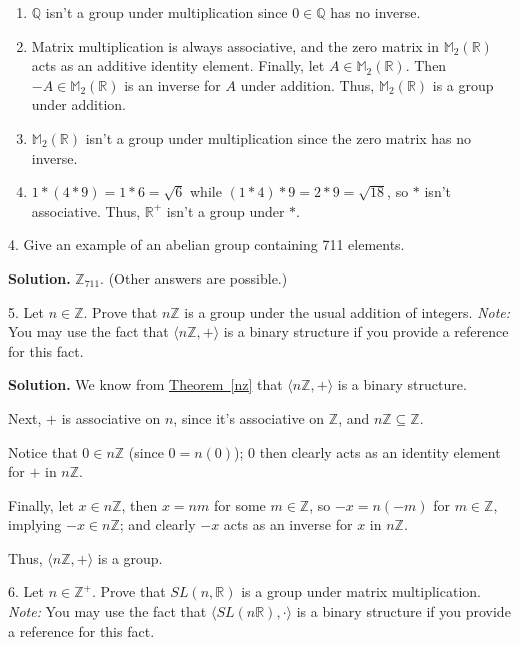 \documentclass[10pt,]{book}
\theoremstyle{plain}
\theoremstyle{definition}
\theoremstyle{definition}
\theoremstyle{definition}
\theoremstyle{definition}
\numberwithin{equation}{section}
\def\Z{\mathbb{Z}}
\def\R{\mathbb{R}}
\def\Q{\mathbb{Q}}
\def\M{\mathbb{M}}
\begin{document}
\begin{exerciselist}
\begin{enumerate}[label=(\alph*)]
\item\hypertarget{li-119}{}\(\Q\) isn't a group under multiplication since \(0\in \Q\) has no inverse.%
\item\hypertarget{li-120}{}Matrix multiplication is always associative, and the zero matrix in \(\M_2(\R)\) acts as an additive identity element.            Finally, let \(A\in \M_2(\R)\).  Then \(-A\in \M_2(\R)\) is an inverse for \(A\) under addition. Thus, \(\M_2(\R)\) is a group under addition.%
\item\hypertarget{li-121}{}\(\M_2(\R)\) isn't a group under multiplication since the zero matrix has no inverse.%
\item\hypertarget{li-122}{}\(1*(4*9)=1*6=\sqrt{6}\) while \((1*4)*9=2*9=\sqrt{18}\), so \(*\) isn't associative.  Thus, \(\R^+\) isn't a group under \(*\).%
\end{enumerate}
%
\item[4.]\hypertarget{exercise-15}{}Give an example of an abelian group containing 711 elements.%
\par\smallskip
\par\smallskip
\noindent\textbf{Solution.}\hypertarget{solution-15}{}\quad
\(\Z_{711}\). (Other answers are possible.)%
\item[5.]\hypertarget{exercise-16}{}Let \(n\in \Z\). Prove that \(n\Z\) is a group under the usual addition of integers. \emph{Note:} You may use the fact that \(\langle n\Z,+\rangle\) is a binary structure if you provide a reference for this fact.%
\par\smallskip
\par\smallskip
\noindent\textbf{Solution.}\hypertarget{solution-16}{}\quad
We know from \hyperref[nz]{Theorem~\ref{nz}} that \(\langle n\Z,+\rangle\) is a binary structure.%
\par
Next, \(+\) is associative on \(n\), since it's associative on \(\Z\), and \(n\Z \subseteq \Z\).%
\par
Notice that \(0\in n\Z\) (since \(0=n(0)\)); 0 then clearly acts as an identity element for \(+\) in \(n\Z\).%
\par
Finally, let \(x\in n\Z\), then \(x=nm\) for some \(m\in \Z\), so \(-x=n(-m)\) for \(m\in \Z\), implying \(-x\in n\Z\); and clearly \(-x\) acts as an inverse for \(x\) in \(n\Z\).%
\par
Thus, \(\langle n\Z, +\rangle\) is a group.%
\item[6.]\hypertarget{exercise-17}{}Let \(n\in \Z^+\). Prove that \(SL(n,\R)\) is a group under matrix multiplication. \emph{Note:} You may use the fact that \(\langle SL(n\R),\cdot\rangle\) is a binary structure if you provide a reference for this fact.%

\end{exerciselist}
\end{document}
